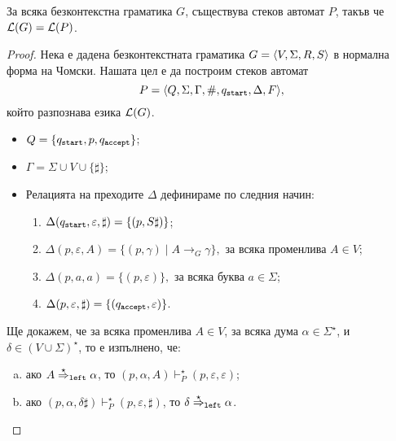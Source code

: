 \begin{important}
  \begin{lemma}
    За всяка безконтекстна граматика $G$,
    съществува стеков автомат $P$, такъв че $\mathcal{L}(G) = \mathcal{L}(P)$.
  \end{lemma}
\end{important}
\begin{proof}
  Нека е дадена безконтекстната граматика $G = \langle{V,\Sigma,R,S}\rangle$ в нормална форма на Чомски.
  Нашата цел е да построим стеков автомат
  \[P = \langle{Q,\Sigma,\Gamma,\#,q_{\texttt{start}},\Delta,F}\rangle,\] който разпознава езика $\mathcal{L}(G)$.
  \begin{itemize}
  \item
    $Q = \{q_{\texttt{start}},p,q_{\texttt{accept}}\}$;
  \item
    $\Gamma = \Sigma \cup V \cup \{\sharp\}$;
  \item
    Релацията на преходите $\Delta$ дефинираме по следния начин:
    \begin{enumerate}[(1)]
    \item 
      $\Delta(q_{\texttt{start}}, \varepsilon, \sharp ) = \{(p,S\sharp)\}$;
    \item
      $\Delta(p,\varepsilon,A) = \{(p,\gamma)\mid A\to_G \gamma\}, \text{ за всяка променлива }A \in V$;
    \item
      $\Delta(p,a,a) = \{(p,\varepsilon)\}, \text{ за всяка буква } a \in \Sigma$;
    \item
      $\Delta(p,\varepsilon,\sharp) = \{(q_{\texttt{accept}}, \varepsilon)\}$.
    \end{enumerate}
  \end{itemize}

  Ще докажем, че за всяка променлива $A \in V$, за всяка дума $\alpha \in \Sigma^\star$,
  и $\delta \in (V \cup \Sigma)^\star$, то е изпълнено, че:
  \begin{enumerate}[(a)]
  \item
    ако $A \stackrel{{\star}}{\Rightarrow}_{\texttt{left}} \alpha$, то $(p, \alpha, A) \vdash^\star_P (p, \varepsilon, \varepsilon)$;
  \item
    ако $(p, \alpha, \delta\sharp) \vdash^\star_P (p, \varepsilon, \sharp)$, то $\delta \stackrel{{\star}}{\Rightarrow}_{\texttt{left}} \alpha$.
  \end{enumerate}
  

\end{proof}
